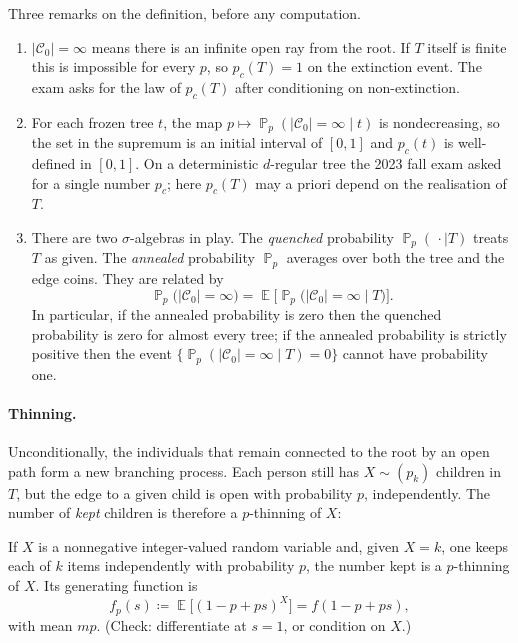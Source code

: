 \documentclass[11pt,a4paper]{article}
\DeclareMathOperator{\E}{\mathbb{E}}
\DeclareMathOperator{\Pbb}{\mathbb{P}}
\begin{document}
Three remarks on the definition, before any computation.
\begin{enumerate}[label=\textup{(\arabic*)}]
    \item
    \(|\mathcal{C}_0|=\infty\) means there is an infinite open ray from the root. If \(T\) itself is finite this is impossible for every \(p\), so \(p_c(T)=1\) on the extinction event. The exam asks for the law of \(p_c(T)\) after conditioning on non-extinction.
    \item
    For each frozen tree \(t\), the map \(p\mapsto\Pbb_p(|\mathcal{C}_0|=\infty\mid t)\) is nondecreasing, so the set in the supremum is an initial interval of \([0,1]\) and \(p_c(t)\) is well-defined in \([0,1]\). On a deterministic \(d\)-regular tree the 2023 fall exam asked for a single number \(p_c\); here \(p_c(T)\) may a priori depend on the realisation of \(T\).
    \item
    There are two \(\sigma\)-algebras in play. The \emph{quenched} probability \(\Pbb_p(\,\cdot\mid T)\) treats \(T\) as given. The \emph{annealed} probability \(\Pbb_p\) averages over both the tree and the edge coins. They are related by
    \[
    \Pbb_p\bigl(|\mathcal{C}_0|=\infty\bigr)
    =
    \E\bigl[\Pbb_p\bigl(|\mathcal{C}_0|=\infty\mid T\bigr)\bigr].
    \]
    In particular, if the annealed probability is zero then the quenched probability is zero for almost every tree; if the annealed probability is strictly positive then the event \(\{\Pbb_p(|\mathcal{C}_0|=\infty\mid T)=0\}\) cannot have probability one.
\end{enumerate}

\paragraph{Thinning.}
Unconditionally, the individuals that remain connected to the root by an open path form a new branching process. Each person still has \(X\sim(p_k)\) children in \(T\), but the edge to a given child is open with probability \(p\), independently. The number of \emph{kept} children is therefore a \(p\)-thinning of \(X\):

\begin{definition}[\(p\)-thinning]
\label{def:thinning}
If \(X\) is a nonnegative integer-valued random variable and, given \(X=k\), one keeps each of \(k\) items independently with probability \(p\), the number kept is a \(p\)-thinning of \(X\). Its generating function is
\[
f_p(s)
\coloneqq
\E\bigl[(1-p+ps)^{X}\bigr]
=
f(1-p+ps),
\]
with mean \(m p\). (Check: differentiate at \(s=1\), or condition on \(X\).)
\end{definition}
\end{document}

